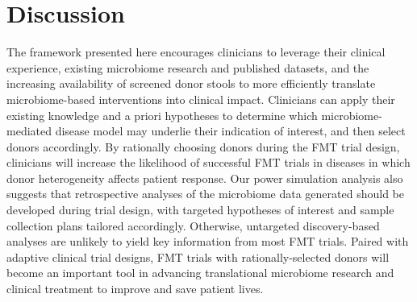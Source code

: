 \section{Discussion}

The framework presented here encourages clinicians to leverage their clinical experience, existing microbiome research and published datasets, and the increasing availability of screened donor stools to more efficiently translate microbiome-based interventions into clinical impact.
Clinicians can apply their existing knowledge and a priori hypotheses to determine which microbiome-mediated disease model may underlie their indication of interest, and then select donors accordingly.
By rationally choosing donors during the FMT trial design, clinicians will increase the likelihood of successful FMT trials in diseases in which donor heterogeneity affects patient response.
Our power simulation analysis also suggests that retrospective analyses of the microbiome data generated should be developed during trial design, with targeted hypotheses of interest and sample collection plans tailored accordingly.
Otherwise, untargeted discovery-based analyses are unlikely to yield key information from most FMT trials.
Paired with adaptive clinical trial designs, FMT trials with rationally-selected donors will become an important tool in advancing translational microbiome research and clinical treatment to improve and save patient lives.

